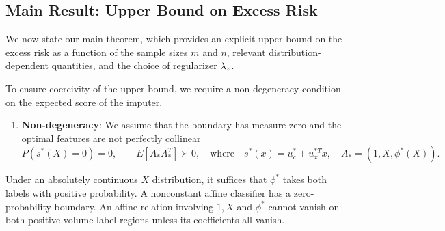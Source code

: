 \subsection{Main Result: Upper Bound on Excess Risk}

We now state our main theorem, which provides an explicit upper bound on the excess risk as a function of the sample sizes $m$ and $n$, relevant distribution-dependent quantities, and the choice of regularizer $\lambda_z$.

To ensure coercivity of the upper bound, we require a non-degeneracy condition on the expected score of the imputer.
\begin{enumerate}
    \item[(ND)] \textbf{Non-degeneracy}: We assume that the boundary has measure zero and the optimal features are not perfectly collinear
    \begin{equation}
        P(s^*(X)=0)=0, \qquad E[A_*A_*^T]\succ 0, \quad \text{where} \quad s^*(x)=u_c^*+u_x^{*T}x,\quad A_*=(1,X,\phi^*(X)).
    \end{equation}
\end{enumerate}
Under an absolutely continuous $X$ distribution, it suffices that $\phi^*$ takes both labels with positive probability. A nonconstant affine classifier has a zero-probability boundary. An affine relation involving $1, X$ and $\phi^*$ cannot vanish on both positive-volume label regions unless its coefficients all vanish.


